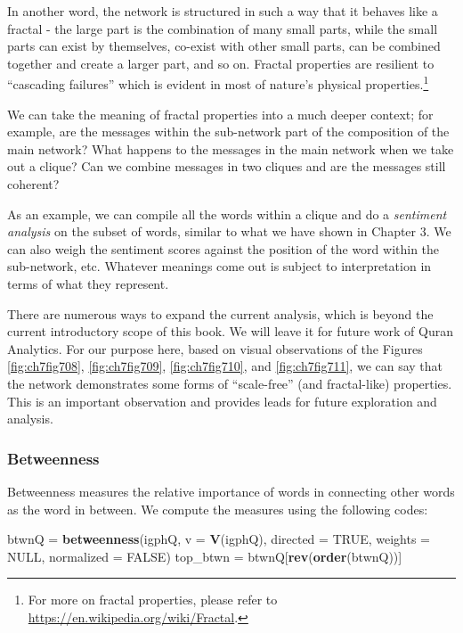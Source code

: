 \documentclass[
]{article}
\newenvironment{Shaded}{\begin{snugshade}}{\end{snugshade}}
\newcommand{\AttributeTok}[1]{\textcolor[rgb]{0.13,0.29,0.53}{#1}}
\newcommand{\ConstantTok}[1]{\textcolor[rgb]{0.56,0.35,0.01}{#1}}
\newcommand{\FunctionTok}[1]{\textcolor[rgb]{0.13,0.29,0.53}{\textbf{#1}}}
\newcommand{\NormalTok}[1]{#1}
\newcommand{\OtherTok}[1]{\textcolor[rgb]{0.56,0.35,0.01}{#1}}
\begin{document}
In another word, the network is structured in such a way that it behaves like a fractal - the large part is the combination of many small parts, while the small parts can exist by themselves, co-exist with other small parts, can be combined together and create a larger part, and so on. Fractal properties are resilient to ``cascading failures'' which is evident in most of nature's physical properties.\footnote{For more on fractal properties, please refer to \url{https://en.wikipedia.org/wiki/Fractal}.}

We can take the meaning of fractal properties into a much deeper context; for example, are the messages within the sub-network part of the composition of the main network? What happens to the messages in the main network when we take out a clique? Can we combine messages in two cliques and are the messages still coherent?

As an example, we can compile all the words within a clique and do a \emph{sentiment analysis} on the subset of words, similar to what we have shown in Chapter 3. We can also weigh the sentiment scores against the position of the word within the sub-network, etc. Whatever meanings come out is subject to interpretation in terms of what they represent.

There are numerous ways to expand the current analysis, which is beyond the current introductory scope of this book. We will leave it for future work of Quran Analytics. For our purpose here, based on visual observations of the Figures \ref{fig:ch7fig708}, \ref{fig:ch7fig709}, \ref{fig:ch7fig710}, and \ref{fig:ch7fig711}, we can say that the network demonstrates some forms of ``scale-free'' (and fractal-like) properties. This is an important observation and provides leads for future exploration and analysis.

\hypertarget{betweenness-1}{%
\subsubsection{Betweenness}\label{betweenness-1}}

Betweenness measures the relative importance of words in connecting other words as the word in between. We compute the measures using the following codes:

\footnotesize

\begin{Shaded}
\begin{Highlighting}[]
\NormalTok{btwnQ }\OtherTok{=} \FunctionTok{betweenness}\NormalTok{(igphQ, }\AttributeTok{v =} \FunctionTok{V}\NormalTok{(igphQ), }\AttributeTok{directed =} \ConstantTok{TRUE}\NormalTok{, }
                    \AttributeTok{weights =} \ConstantTok{NULL}\NormalTok{, }\AttributeTok{normalized =} \ConstantTok{FALSE}\NormalTok{)}
\NormalTok{top\_btwn }\OtherTok{=}\NormalTok{ btwnQ[}\FunctionTok{rev}\NormalTok{(}\FunctionTok{order}\NormalTok{(btwnQ))]}
\end{Highlighting}
\end{Shaded}
\end{document}
